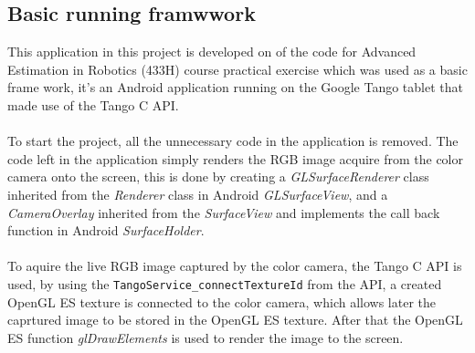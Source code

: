 \documentclass[12pt,twoside]{article}
\begin{document}
\subsection{Basic running framwwork}
This application in this project is developed on of the code for Advanced Estimation in Robotics (433H) course practical exercise which was used as a basic frame work, it's an Android application running on the Google Tango tablet that made use of the Tango C API.\\
\\
To start the project, all the unnecessary code in the application is removed. The code left in the application simply renders the RGB image acquire from the color camera onto the screen, this is done by creating a \textit{GLSurfaceRenderer} class inherited from the \textit{Renderer} class in Android \textit{GLSurfaceView}, and a \textit{CameraOverlay} inherited from the \textit{SurfaceView} and implements the call back function in Android \textit{SurfaceHolder}.\\
\\
To aquire the live RGB image captured by the color camera, the Tango C API is used, by using the \verb|TangoService_connectTextureId| from the API, a created OpenGL ES texture is connected to the color camera, which allows later the caprtured image to be stored in the OpenGL ES texture. After that the OpenGL ES function \textit{glDrawElements} is used to render the image to the screen.\\
\\

\newpage
\end{document}
